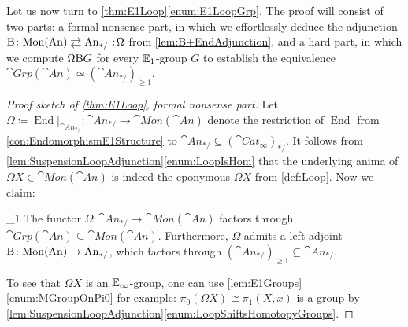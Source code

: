 Let us now turn to \cref{thm:E1Loop}\cref{enum:E1LoopGrp}. The proof will consist of two parts: a formal nonsense part, in which we effortlessly deduce the adjunction $\B\colon \cat{Mon}(\cat{An})\shortdoublelrmorphism \cat{An}_{*/}\noloc \Omega$ from \cref{lem:B+EndAdjunction}, and a hard part, in which we compute $\Omega\mathrm{B} G$ for every $\mathbb{E}_1$-group $G$ to establish the equivalence $\cat{Grp}(\cat{An})\simeq (\cat{An}_{*/})_{\geqslant 1}$.

\begin{proof}[Proof sketch of \cref{thm:E1Loop}, formal nonsense part]
	Let $\Omega\coloneqq \operatorname{End}|_{\cat{An}_{*/}}\colon \cat{An}_{*/}\rightarrow \cat{Mon}(\cat{An})$ denote the restriction of $\operatorname{End}$ from \cref{con:EndomorphismE1Structure} to $\cat{An}_{*/}\subseteq(\cat{Cat}_\infty)_{*/}$. It follows from \cref{lem:SuspensionLoopAdjunction}\cref{enum:LoopIsHom} that the underlying anima of $\Omega X\in \cat{Mon}(\cat{An})$ is indeed the eponymous $\Omega X$ from \cref{def:Loop}. Now we claim:
	\begin{alphanumerate}\itshape
		\item[\boxtimes_1] \!The functor $\Omega\colon \cat{An}_{*/}\rightarrow \cat{Mon}(\cat{An})$ factors through $\cat{Grp}(\cat{An})\subseteq \cat{Mon}(\cat{An})$. Furthermore, $\Omega$ admits a left adjoint $\mathrm{B}\colon \mathrm{Mon}(\mathrm{An})\rightarrow \mathrm{An}_{*/}$, which factors through $(\cat{An}_{*/})_{\geqslant 1}\subseteq \cat{An}_{*/}$.\label{claim:BOmegaAdjunction}
	\end{alphanumerate}
	To see that $\Omega X$ is an $\mathbb{E}_\infty$-group, one can use \cref{lem:E1Groups}\cref{enum:MGroupOnPi0} for example: $\pi_0(\Omega X)\cong \pi_1(X,x)$ is a group by \cref{lem:SuspensionLoopAdjunction}\cref{enum:LoopShiftsHomotopyGroups}.
	

\end{proof}
